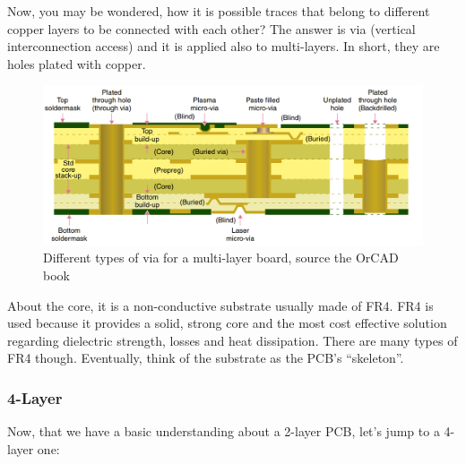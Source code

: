\documentclass[final]{cubedoc}
\begin{document}
	Now, you may be wondered, how it is possible traces that belong to different copper layers to be connected with each other? The answer is via (vertical interconnection access) and it is applied also to multi-layers. In short, they are holes plated with copper.
	
	\begin{figure}[h!]
		\centering
		\includegraphics[width=\textwidth, height=.25\textheight]{assets/via.png}
		\caption{Different types of via for a multi-layer board, source the OrCAD book}
	\end{figure}
	
	About the core, it is a non-conductive substrate usually made of FR4. FR4 is used because it provides a solid, strong core and the most cost effective solution regarding dielectric strength, losses and heat dissipation. There are many types of FR4 though. Eventually, think of the substrate as the PCB’s “skeleton”. 
	
	\subsubsection{4-Layer}
	Now, that we have a basic understanding about a 2-layer PCB, let’s jump to a 4-layer one:
	
\end{document}
